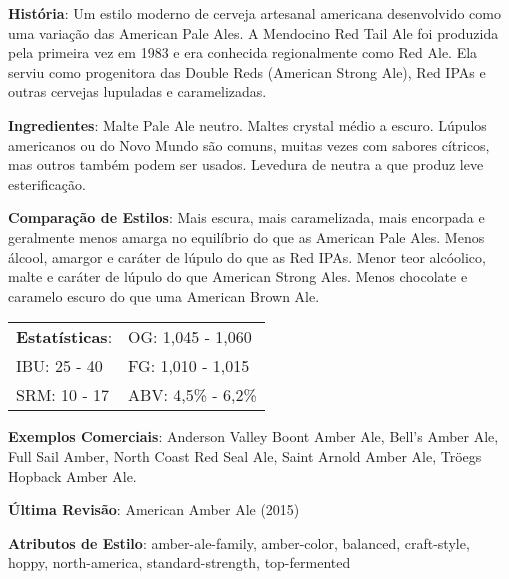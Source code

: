 \textbf{História}: Um estilo moderno de cerveja artesanal americana desenvolvido como uma variação das American Pale Ales. A Mendocino Red Tail Ale foi produzida pela primeira vez em 1983 e era conhecida regionalmente como Red Ale. Ela serviu como progenitora das Double Reds (American Strong Ale), Red IPAs e outras cervejas lupuladas e caramelizadas.

\textbf{Ingredientes}: Malte Pale Ale neutro. Maltes crystal médio a escuro. Lúpulos americanos ou do Novo Mundo são comuns, muitas vezes com sabores cítricos, mas outros também podem ser usados. Levedura de neutra a que produz leve esterificação.

\textbf{Comparação de Estilos}: Mais escura, mais caramelizada, mais encorpada e geralmente menos amarga no equilíbrio do que as American Pale Ales. Menos álcool, amargor e caráter de lúpulo do que as Red IPAs. Menor teor alcóolico, malte e caráter de lúpulo do que American Strong Ales. Menos chocolate e caramelo escuro do que uma American Brown Ale.

\begin{tabular}{@{}p{35mm}p{35mm}@{}}
  \textbf{Estatísticas}: & OG: 1,045 - 1,060 \\
  IBU: 25 - 40  & FG: 1,010 - 1,015  \\
  SRM: 10 - 17  & ABV: 4,5\% - 6,2\%
\end{tabular}

\textbf{Exemplos Comerciais}: Anderson Valley Boont Amber Ale, Bell’s Amber Ale, Full Sail Amber, North Coast Red Seal Ale, Saint Arnold Amber Ale, Tröegs Hopback Amber Ale.

\textbf{Última Revisão}: American Amber Ale (2015)

\textbf{Atributos de Estilo}: amber-ale-family, amber-color, balanced, craft-style, hoppy, north-america, standard-strength, top-fermented
